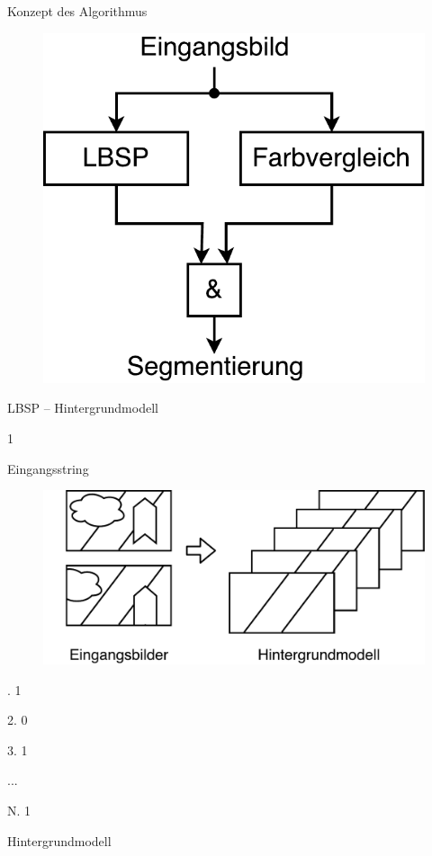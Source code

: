 \documentclass[hyperref={pdfpagelabels=false}]{beamer}
\begin{document}
\begin{frame}[t]{Konzept des Algorithmus}
	\begin{figure}
		\centering
		\includegraphics[width=0.6\linewidth]{Abbildungen/Konzept.pdf}
		\label{fig:Abbildungen/Grid}
	\end{figure}
\end{frame}


\begin{frame}[t]{LBSP -- Hintergrundmodell}
	\bigskip
	\bigskip
	\vspace{1em}
	\centering
	\begin{minipage}{0.43\linewidth}
		\centering
		\vspace{5.5em}

		1\quad0
		
		\vspace{5.5em}
		Eingangsstring
	\end{minipage}
	\begin{minipage}{0.08\linewidth}
		\begin{figure}%
			\centering
			\includegraphics[width=0.8\linewidth]{Abbildungen/Pfeil.pdf}
			\vspace{1em}
		\end{figure}
	\end{minipage}
	\begin{minipage}{0.43\linewidth} 
		. 1
		\bigskip
		
		2. 0
		\bigskip
		
		3. 1\quad 1
		\bigskip
		
		...
		\bigskip

		N. 1\quad0
		\bigskip
		
		\vspace{1em}
		Hintergrundmodell


	\end{minipage}

\end{frame}
\end{document}
